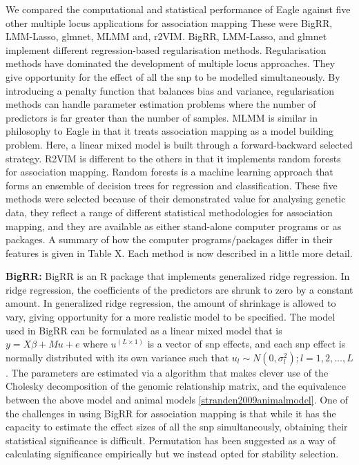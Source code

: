 \documentclass{nature}
\begin{document}
We compared the computational and statistical performance of Eagle against five other multiple locus applications for 
association mapping  These were BigRR, LMM-Lasso, glmnet, MLMM  and, r2VIM. 
BigRR, LMM-Lasso, and glmnet  implement different regression-based regularisation methods. Regularisation methods have dominated 
the development of multiple locus approaches.  They give opportunity for the effect of all the snp to be modelled simultaneously. 
By introducing a penalty function that balances bias and variance, regularisation methods can 
handle parameter estimation problems where the number of predictors is far greater than the number of samples.  
MLMM is similar in philosophy to Eagle in that it treats association mapping as a model building problem. Here, a linear mixed 
model is built through a forward-backward selected strategy.  
R2VIM is different to the others in that it implements 
random forests for association mapping. 
Random forests is a machine learning approach that forms an ensemble of decision trees for regression and 
classification. 
These five methods were selected because of their demonstrated value 
for analysing genetic data, they reflect a range of different statistical methodologies for association mapping, and they are available as 
either stand-alone computer programs or as  packages. A summary of how the computer programs/packages differ in their 
features is given in Table X. Each method is now described in a little more detail. 



\textbf{BigRR:} BigRR \cite{shen2013novel}  is an R package that implements generalized ridge regression.
In ridge regression, the coefficients of the predictors are shrunk 
to zero by a constant amount.  In generalized ridge regression, the amount of shrinkage is allowed to vary, giving opportunity for 
a more realistic model to be specified. The model used in BigRR can be formulated as a linear mixed model that is 
$y = X \beta + M u + e$ where $u^{(L \times 1)}$ is a vector of snp effects, and each snp 
effect is normally distributed with its own variance such that $u_l \sim N(0, \sigma^2_l); l=1,2, \ldots, L$. 
The parameters are estimated via a 
algorithm that makes clever use of the Cholesky decomposition of the genomic relationship matrix, 
and the equivalence between the above model and animal models \ref{stranden2009animalmodel}. 
One of the challenges in using BigRR for association mapping is that while it has the capacity to estimate the effect sizes of all the snp simultaneously, 
obtaining their statistical significance is difficult. 
Permutation has been suggested as a way of calculating significance 
empirically \cite{shen2013novel} but we instead opted for stability selection.
\end{document}
